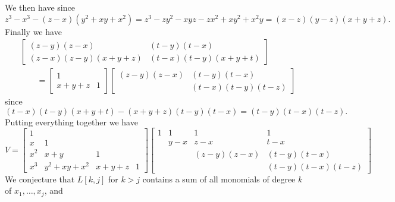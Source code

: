\documentclass[12pt,a4paper]{article}
\begin{document}
We then have
since
\[
z^3 - x^3 - (z-x) (y^2 + x y + x^2) = z^3 - z y^2 - x y z  - z x^2 + x y^2  + x^2 y
= (x-z)(y-z) (x+y+z).
\]
Finally we have
\begin{align*}
&\begin{bmatrix}
 (z-y)(z-x) & (t-y)(t-x) \\
 (z-x)(z-y) (x+y+z) & (t-x)(t-y) (x+y+t)
\end{bmatrix}\\
&\qquad = \begin{bmatrix}
 1 & \\
 x+y+z & 1
\end{bmatrix}
 \begin{bmatrix}
 (z-y)(z-x) & (t-y)(t-x) \\
  & (t-x)(t-y) (t-z)
\end{bmatrix}
\end{align*}
since
\[
(t-x)(t-y) (x+y+t) - (x+y+z) (t-y)(t-x) = (t-y)(t-x)(t-z).
\]
Putting everything together we have
\[
V = \begin{bmatrix}
1 &  \\
x & 1 \\
x^2 & x+y  & 1 \\
x^3 &y^2 + xy + x^2  & x+ y + z & 1
\end{bmatrix} \begin{bmatrix}
1 & 1 & 1 & 1\\
 & y-x & z-x & t-x \\
 &  & (z-y)(z-x) & (t-y)(t-x) \\
 &  &  & (t-y)(t-x)(t-z)
\end{bmatrix}
\]
We conjecture that $L[k,j]$ for $k > j$ contains a sum of all monomials of degree $k$ of $x_1,\ensuremath{\ldots},x_j$, and
\end{document}
